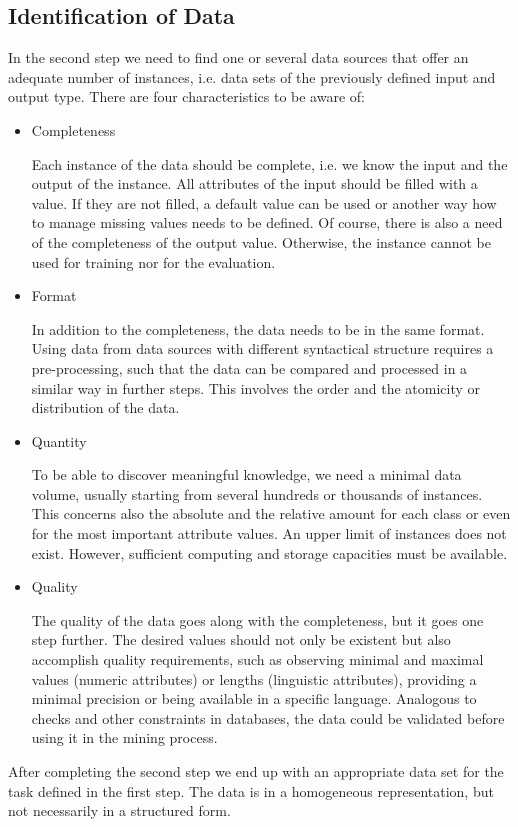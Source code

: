 \documentclass[article,type=msc,colorback,accentcolor=tud7b]{tudthesis}
\begin{document}
  \subsection{Identification of Data}
    In the second step we need to find one or several data sources that offer an adequate number of instances, i.e. data sets of the previously defined input and output type. There are four characteristics to be aware of:
    \begin{itemize}
      \item Completeness
      
        Each instance of the data should be complete, i.e. we know the input and the output of the instance. All attributes of the input should be filled with a value. If they are not filled, a default value can be used or another way how to manage missing values needs to be defined. Of course, there is also a need of the completeness of the output value. Otherwise, the instance cannot be used for training nor for the evaluation.
      \item Format
      
        In addition to the completeness, the data needs to be in the same format. Using data from data sources with different syntactical structure requires a pre-processing, such that the data can be compared and processed in a similar way in further steps. This involves the order and the atomicity or distribution of the data.
      \item Quantity
      
        To be able to discover meaningful knowledge, we need a minimal data volume, usually starting from several hundreds or thousands of instances. This concerns also the absolute and the relative amount for each class or even for the most important attribute values. An upper limit of instances does not exist. However, sufficient computing and storage capacities must be available.
      \item Quality
      
        The quality of the data goes along with the completeness, but it goes one step further. The desired values should not only be existent but also accomplish quality requirements, such as observing minimal and maximal values (numeric attributes) or lengths (linguistic attributes), providing a minimal precision or being available in a specific language. Analogous to checks and other constraints in databases, the data could be validated before using it in the mining process.
    \end{itemize}
    After completing the second step we end up with an appropriate data set for the task defined in the first step. The data is in a homogeneous representation, but not necessarily in a structured form.
\end{document}
